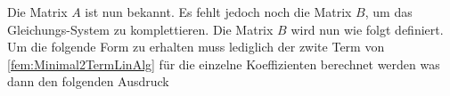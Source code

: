 Die Matrix $A$ ist nun bekannt. Es fehlt jedoch noch die Matrix $B$, um das Gleichungs-System zu komplettieren. Die Matrix $B$ wird nun wie folgt definiert. Um die folgende Form zu erhalten muss lediglich der zwite Term von \eqref{fem:Minimal2TermLinAlg} für die einzelne Koeffizienten berechnet werden was dann den folgenden Ausdruck

